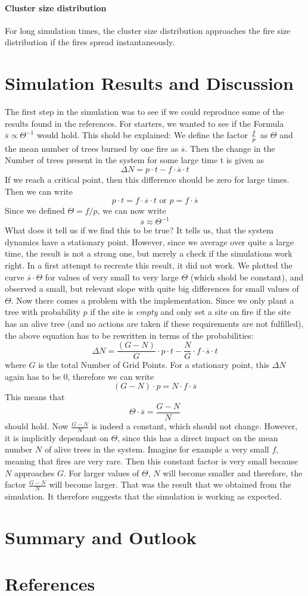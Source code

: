 \documentclass[11pt]{article}
\begin{document}
\paragraph*{Cluster size distribution}
For long simulation times, the cluster size distribution approaches the fire size distribution if the fires spread instantaneously. 


\section{Simulation Results and Discussion}
The first step in the simulation was to see if we could reproduce some of the results found in the references. For starters, we wanted to see if the Formula $\overline s \varpropto  \Theta^{-1}$ would hold. This shold be explained: We define the factor $f \over p$ as $\Theta$ and the mean number of trees burned by one fire as $\overline s$. Then the change in the Number of trees present in the system for some large time t is given as $$\Delta N = p\cdot t - f\cdot \overline s \cdot t$$ 
If we reach a critical point, then this difference should be zero for large times. Then we can write $$p\cdot t = f\cdot \overline s \cdot t \mbox{ or }p=f\cdot \overline s$$ 
Since we defined $\Theta = f / p$, we can now write $$\overline s \approx \Theta ^{-1}$$
What does it tell us if we find this to be true? It tells us, that the system dynamics have a stationary point. However, since we average over quite a large time, the result is not a strong one, but merely a check if the simulations work right.
In a first attempt to recreate this result, it did not work. We plotted the curve $\overline s \cdot \Theta $ for values of very small to very large $\Theta$ (which shold be constant), and observed a small, but relevant slope with quite big differences for small values of $\Theta$. 
Now there comes a problem with the implementation. Since we only plant a tree with probability $p$ if the site is \emph{empty} and only set a site on fire if the site has an alive tree (and no actions are taken if these requirements are not fulfilled), the above equation has to be rewritten in terms of the probabilities: $$\Delta N= \frac{(G-N)} {G} \cdot p\cdot t- \frac{N}{G} \cdot f\cdot \overline s\cdot t$$
where $G$ is the total Number of Grid Points. For a stationary point, this $\Delta N$ again has to be $0$, therefore we can write $$(G-N)\cdot p = N\cdot f \cdot \overline s$$
This means that $$\Theta \cdot \overline s=\frac{G-N}{N}$$ should hold. Now $\frac {G-N}{N}$ is indeed a constant, which should not change. However, it is implicitly dependant on $\Theta$, since this has a direct impact on the mean number $N$ of alive trees in the system. Imagine for example a very small $f$, meaning that fires are very rare. Then this constant factor is very small because $N$ approaches $G$. For larger values of $\Theta$, $N$ will become smaller and therefore, the factor $\frac{G-N}{N}$ will become larger. 
That was the result that we obtained from the simulation. It therefore suggests that the simulation is working as expected. 

\section{Summary and Outlook}

\section{References}
\end{document}
